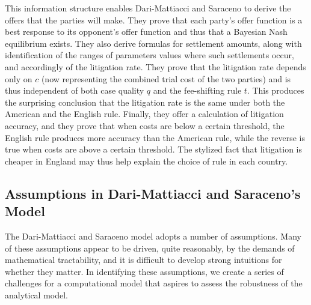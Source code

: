 \documentclass{article}
\begin{document}
This information structure enables Dari-Mattiacci and Saraceno to derive the offers that the parties will make. They prove that each party's offer function is a best response to its opponent's offer function and thus that a Bayesian Nash equilibrium exists. They also derive formulas for settlement amounts, along with identification of the ranges of parameters values where such settlements occur, and accordingly of the litigation rate. They prove that the litigation rate depends only on $c$ (now representing the combined trial cost of the two parties) and is thus independent of both case quality $q$ and the fee-shifting rule $t$. This produces the surprising conclusion that the litigation rate is the same under both the American and the English rule. Finally, they offer a calculation of litigation accuracy, and they prove that when costs are below a certain threshold, the English rule produces more accuracy than the American rule, while the reverse is true when costs are above a certain threshold. The stylized fact that litigation is cheaper in England may thus help explain the choice of rule in each country.

\subsection{Assumptions in Dari-Mattiacci and Saraceno's Model}

The Dari-Mattiacci and Saraceno model adopts a number of assumptions. Many of these assumptions appear to be driven, quite reasonably, by the demands of mathematical tractability, and it is difficult to develop strong intuitions for whether they matter. In identifying these assumptions, we create a series of challenges for a computational model that aspires to assess the robustness of the analytical model.
\end{document}
